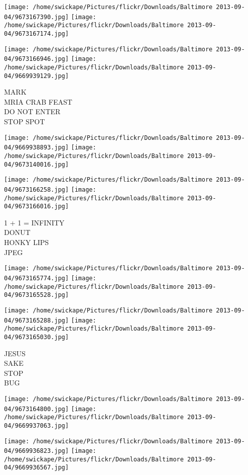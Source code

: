 \documentclass[10pt,letterpaper]{article}
\begin{document}
\texttt{[image: /home/swickape/Pictures/flickr/Downloads/Baltimore 2013-09-04/9673167390.jpg]}
\texttt{[image: /home/swickape/Pictures/flickr/Downloads/Baltimore 2013-09-04/9673167174.jpg]}

\texttt{[image: /home/swickape/Pictures/flickr/Downloads/Baltimore 2013-09-04/9673166946.jpg]}
\texttt{[image: /home/swickape/Pictures/flickr/Downloads/Baltimore 2013-09-04/9669939129.jpg]}

MARK\\
MRIA CRAB FEAST\\
DO NOT ENTER\\
STOP SPOT
\pagebreak

\texttt{[image: /home/swickape/Pictures/flickr/Downloads/Baltimore 2013-09-04/9669938893.jpg]}
\texttt{[image: /home/swickape/Pictures/flickr/Downloads/Baltimore 2013-09-04/9673140016.jpg]}

\texttt{[image: /home/swickape/Pictures/flickr/Downloads/Baltimore 2013-09-04/9673166258.jpg]}
\texttt{[image: /home/swickape/Pictures/flickr/Downloads/Baltimore 2013-09-04/9673166016.jpg]}

1 + 1 = INFINITY\\
DONUT\\
HONKY LIPS\\
JPEG
\pagebreak

\texttt{[image: /home/swickape/Pictures/flickr/Downloads/Baltimore 2013-09-04/9673165774.jpg]}
\texttt{[image: /home/swickape/Pictures/flickr/Downloads/Baltimore 2013-09-04/9673165528.jpg]}

\texttt{[image: /home/swickape/Pictures/flickr/Downloads/Baltimore 2013-09-04/9673165288.jpg]}
\texttt{[image: /home/swickape/Pictures/flickr/Downloads/Baltimore 2013-09-04/9673165030.jpg]}

JESUS\\
SAKE\\
STOP\\
BUG
\pagebreak

\texttt{[image: /home/swickape/Pictures/flickr/Downloads/Baltimore 2013-09-04/9673164800.jpg]}
\texttt{[image: /home/swickape/Pictures/flickr/Downloads/Baltimore 2013-09-04/9669937063.jpg]}

\texttt{[image: /home/swickape/Pictures/flickr/Downloads/Baltimore 2013-09-04/9669936823.jpg]}
\texttt{[image: /home/swickape/Pictures/flickr/Downloads/Baltimore 2013-09-04/9669936567.jpg]}
\end{document}
